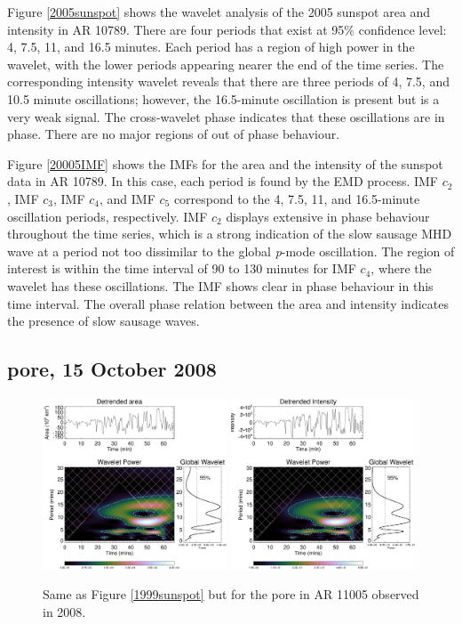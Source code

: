 	Figure \ref{2005sunspot} shows the wavelet analysis of the 2005 sunspot area and intensity in AR 10789.
	There are four periods that exist at 95\% confidence level: 4, 7.5, 11, and 16.5 minutes.
	Each period has a region of high power in the wavelet, with the lower periods appearing nearer the end of the time series.
	The corresponding intensity wavelet reveals that there are three periods of 4, 7.5, and 10.5 minute oscillations; however, the 16.5-minute oscillation is present but is a very weak signal.
	The cross-wavelet phase indicates that these oscillations are in phase.
	There are no major regions of out of phase behaviour.
		
	Figure \ref{20005IMF} shows the IMFs for the area and the intensity of the sunspot data in AR 10789.
	In this case, each period is found by the EMD process. IMF $c_{2}$, IMF $c_{3}$, IMF $c_{4}$, and IMF $c_{5}$ correspond to the 4, 7.5, 11, and 16.5-minute oscillation periods, respectively.
	IMF $c_{2}$ displays extensive in phase behaviour throughout the time series, which is a strong indication of the slow sausage MHD wave at a period not too dissimilar to the global \textit{p}-mode oscillation.
	The region of interest is within the time interval of 90 to 130 minutes for IMF $c_{4}$, where the wavelet has these oscillations.
	The IMF shows clear in phase behaviour in this time interval.
	The overall phase relation between the area and intensity indicates the presence of slow sausage waves.
	
\subsection{pore, 15 October 2008}

   \begin{figure}
   \centering
   \includegraphics[width=0.49\textwidth]{2008_wl.eps}
   \includegraphics[width=0.49\textwidth]{2008_wl_inten.eps}
   	   \caption{
      			Same as Figure \ref{1999sunspot} but for the pore in AR 11005 observed in 2008.
 		      }
      \label{2008pore}
   \end{figure}
   
